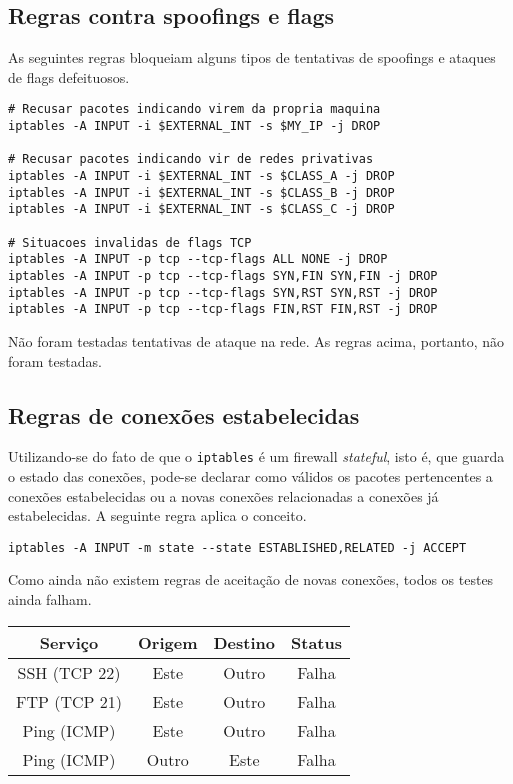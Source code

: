 \documentclass[a4paper,titlepage,11pt]{article}
\begin{document}
\subsection{Regras contra spoofings e flags}

As seguintes regras bloqueiam alguns tipos de tentativas de spoofings e ataques de flags defeituosos.
\begin{Verbatim}
# Recusar pacotes indicando virem da propria maquina
iptables -A INPUT -i $EXTERNAL_INT -s $MY_IP -j DROP

# Recusar pacotes indicando vir de redes privativas
iptables -A INPUT -i $EXTERNAL_INT -s $CLASS_A -j DROP
iptables -A INPUT -i $EXTERNAL_INT -s $CLASS_B -j DROP
iptables -A INPUT -i $EXTERNAL_INT -s $CLASS_C -j DROP

# Situacoes invalidas de flags TCP
iptables -A INPUT -p tcp --tcp-flags ALL NONE -j DROP
iptables -A INPUT -p tcp --tcp-flags SYN,FIN SYN,FIN -j DROP
iptables -A INPUT -p tcp --tcp-flags SYN,RST SYN,RST -j DROP
iptables -A INPUT -p tcp --tcp-flags FIN,RST FIN,RST -j DROP
\end{Verbatim}

Não foram testadas tentativas de ataque na rede. As regras acima, portanto, não foram testadas.

\subsection{Regras de conexões estabelecidas}

Utilizando-se do fato de que o \verb|iptables| é um firewall {\em stateful}, isto é, que guarda o estado das conexões, pode-se declarar como válidos os pacotes pertencentes a conexões estabelecidas ou a novas conexões relacionadas a conexões já estabelecidas. A seguinte regra aplica o conceito.

\begin{Verbatim}
iptables -A INPUT -m state --state ESTABLISHED,RELATED -j ACCEPT
\end{Verbatim}

Como ainda não existem regras de aceitação de novas conexões, todos os testes ainda falham.

\begin{center}
	\begin{tabular}{cccc}
		\hline
		Serviço & Origem & Destino & Status  \\
		\hline
		SSH (TCP 22) & Este & Outro & Falha \\
		FTP (TCP 21) & Este & Outro & Falha \\
		Ping (ICMP) & Este & Outro & Falha \\
		Ping (ICMP) & Outro & Este & Falha \\
		\hline
	\end{tabular}
\end{center}
\end{document}
